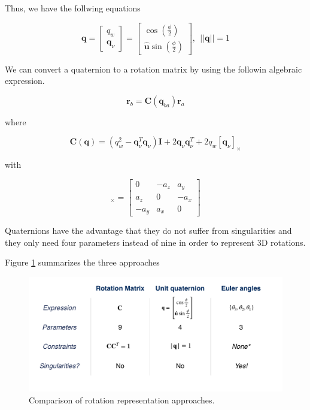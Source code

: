 Thus, we have the follwing equations

\begin{equation}
\mathbf{q} = 
\begin{bmatrix}
q_w \\
\mathbf{q}_{\nu}
\end{bmatrix} = 
\begin{bmatrix}
\cos(\frac{\phi}{2}) \\
\hat{\mathbf{u}}\sin(\frac{\phi}{2})
\end{bmatrix}, ~~ ||\mathbf{q}|| = 1
\end{equation}

We can convert a quaternion
to a rotation matrix by using the followin algebraic expression. 


\begin{equation}
\mathbf{r}_b = \mathbf{C}(\mathbf{q}_{ba})\mathbf{r}_a
\end{equation}

where 

\begin{equation}
\mathbf{C}(\mathbf{q}) = (q_{w}^2 - \mathbf{q}_{\nu}^T\mathbf{q}_{\nu})\mathbf{I} + 2\mathbf{q}_{\nu}\mathbf{q}_{\nu}^T + 2q_w[\mathbf{q}_{\nu}]_{\times}
\end{equation}

with

\begin{equation}
[\mathbf{a}]_{\times} =
\begin{bmatrix}
0 & -a_z & a_y \\
a_z & 0 & -a_x \\
-a_y & a_x & 0
\end{bmatrix}
\end{equation}

Quaternions have the advantage that they do not suffer from singularities and they only need
four parameters instead of nine in order to represent 3D rotations. 


Figure \ref{coordinate_rotations_5} summarizes the three approaches

\begin{figure}[!htb]
\begin{center}
\includegraphics[scale=0.290]{img/coordinate_transforms/coordinate_rotations_5.jpeg}
\end{center}
\caption{Comparison of rotation representation approaches.}
\label{coordinate_rotations_5}
\end{figure}

 
